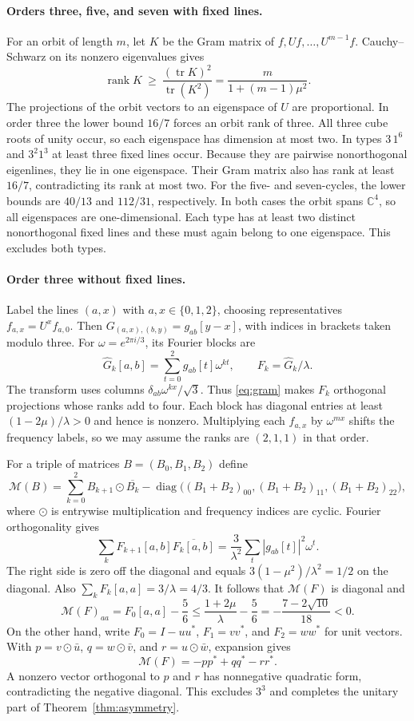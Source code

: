 \documentclass[11pt]{article}
\newcommand{\C}{\mathbb C}
\newcommand{\tr}{\operatorname{tr}}
\newcommand{\rank}{\operatorname{rank}}
\newcommand{\diag}{\operatorname{diag}}
\begin{document}
\paragraph{Orders three, five, and seven with fixed lines.}
For an orbit of length $m$, let $K$ be the Gram matrix of $f,Uf,\ldots,U^{m-1}f$. Cauchy--Schwarz on its nonzero eigenvalues gives
\begin{equation}\label{eq:orbit-rank}
 \rank K\ \ge\ \frac{(\tr K)^2}{\tr(K^2)}
 =\frac{m}{1+(m-1)\mu^2}.
\end{equation}
The projections of the orbit vectors to an eigenspace of $U$ are proportional. In order three the lower bound $16/7$ forces an orbit rank of three. All three cube roots of unity occur, so each eigenspace has dimension at most two. In types $3\,1^6$ and $3^2 1^3$ at least three fixed lines occur. Because they are pairwise nonorthogonal eigenlines, they lie in one eigenspace. Their Gram matrix also has rank at least $16/7$, contradicting its rank at most two. For the five- and seven-cycles, the lower bounds are $40/13$ and $112/31$, respectively. In both cases the orbit spans $\C^4$, so all eigenspaces are one-dimensional. Each type has at least two distinct nonorthogonal fixed lines and these must again belong to one eigenspace. This excludes both types.

\paragraph{Order three without fixed lines.}
Label the lines $(a,x)$ with $a,x\in\{0,1,2\}$, choosing representatives $f_{a,x}=U^x f_{a,0}$. Then $G_{(a,x),(b,y)}=g_{ab}[y-x]$, with indices in brackets taken modulo three. For $\omega=e^{2\pi i/3}$, its Fourier blocks are
\[
 \widehat G_k[a,b]=\sum_{t=0}^2 g_{ab}[t]\omega^{kt},\qquad F_k=\widehat G_k/\lambda.
\]
The transform uses columns $\delta_{ab}\omega^{kx}/\sqrt3$. Thus \eqref{eq:gram} makes $F_k$ orthogonal projections whose ranks add to four. Each block has diagonal entries at least $(1-2\mu)/\lambda>0$ and hence is nonzero. Multiplying each $f_{a,x}$ by $\omega^{mx}$ shifts the frequency labels, so we may assume the ranks are $(2,1,1)$ in that order.

For a triple of matrices $B=(B_0,B_1,B_2)$ define
\[
 \mathcal M(B)=\sum_{k=0}^2 B_{k+1}\odot\overline{B_k}
   -\diag\bigl((B_1+B_2)_{00},(B_1+B_2)_{11},(B_1+B_2)_{22}\bigr),
\]
where $\odot$ is entrywise multiplication and frequency indices are cyclic. Fourier orthogonality gives
\[
 \sum_k F_{k+1}[a,b]\overline{F_k[a,b]}
  =\frac{3}{\lambda^2}\sum_t |g_{ab}[t]|^2\omega^t.
\]
The right side is zero off the diagonal and equals $3(1-\mu^2)/\lambda^2=1/2$ on the diagonal. Also $\sum_k F_k[a,a]=3/\lambda=4/3$. It follows that $\mathcal M(F)$ is diagonal and
\[
 \mathcal M(F)_{aa}=F_0[a,a]-\frac56
 \le \frac{1+2\mu}{\lambda}-\frac56=-\frac{7-2\sqrt{10}}{18}<0.
\]
On the other hand, write $F_0=I-uu^*$, $F_1=vv^*$, and $F_2=ww^*$ for unit vectors. With $p=v\odot\bar u$, $q=w\odot\bar v$, and $r=u\odot\bar w$, expansion gives
\[
 \mathcal M(F)=-pp^*+qq^*-rr^*.
\]
A nonzero vector orthogonal to $p$ and $r$ has nonnegative quadratic form, contradicting the negative diagonal. This excludes $3^3$ and completes the unitary part of Theorem~\ref{thm:asymmetry}.
\end{document}
